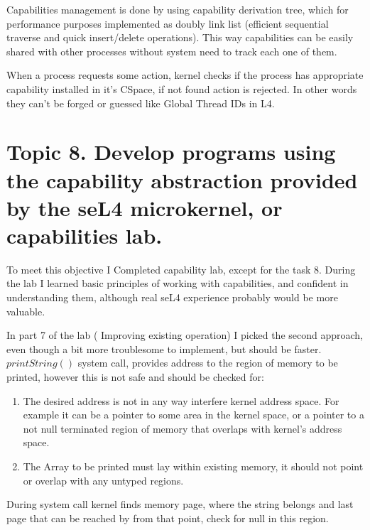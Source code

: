 \documentclass{article}
\begin{document}
        Capabilities management is done by using capability derivation tree, which for performance purposes
        implemented as doubly link list (efficient sequential traverse and quick insert/delete operations).
        This way capabilities can be easily shared with other processes without system need to track each one
        of them.

        When a process requests some action, kernel checks if the process has appropriate capability
        installed in it's CSpace, if not found action is rejected. In other words they can't be
        forged or guessed like Global Thread IDs in L4.

        \section{Topic 8. Develop programs using the capability abstraction provided by the seL4
        microkernel, or capabilities lab.}

        To meet this objective I Completed capability lab, except for the task 8. 
        During the lab I learned basic principles of working with
        capabilities, and confident in understanding them, although real seL4 experience probably would be more valuable.

        In part 7 of the lab ( Improving existing operation) I picked the second approach, even though a bit more
        troublesome to implement, but should be faster. $printString()$ system call, provides address to the region of memory to be
        printed, however this is not safe and should be checked for:
        \begin{enumerate}[1.]
            \item The desired address is not in any way interfere kernel address space. For
            example it can be  a pointer to some area in the 
                kernel space, or a pointer to a not null terminated region of memory that overlaps with kernel's address space.
           \item The Array to be printed must lay within existing memory, it should not point or overlap with any untyped
               regions.
        \end{enumerate}

        During system call kernel finds memory page, where the string belongs and last page
        that can be reached by from that point, check for null in this region.
\end{document}
